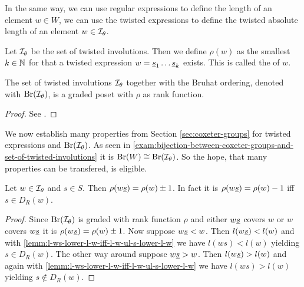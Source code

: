 In the same way, we can use regular expressions to define the length of an element $w \in W$, we can use the twisted expressions to define the twisted absolute length of an element $w \in \mathcal{I}_{\theta}$.

\begin{defi}
	Let $\mathcal{I}_{\theta}$ be the set of twisted involutions. Then we define $\rho(w)$ as the smallest $k \in \mathbb{N}$ for that a twisted expression $w = \underline{s}_1 \ldots \underline{s}_k$ exists. This is called the  of $w$.
\end{defi}

\begin{lemm}
	The set of twisted involutions $\mathcal{I}_{\theta}$ together with the Bruhat ordering, denoted with $\operatorname{Br}(\mathcal{I}_{\theta})$, is a graded poset with $\rho$ as rank function.

	\begin{proof}
		See \cite[Theorem 4.8]{hultman:bruhat-order}.
	\end{proof}
\end{lemm}

We now establish many properties from Section \ref{sec:coxeter-groups} for twisted expressions and $\operatorname{Br}(\mathcal{I}_{\theta})$. As seen in \ref{exam:bijection-between-coxeter-groups-and-set-of-twisted-involutions} it is $\operatorname{Br}(W) \cong \operatorname{Br}(\mathcal{I}_{\theta})$. So the hope, that many properties can be transfered, is eligible.

\begin{lemm}
	Let $w \in \mathcal{I}_{\theta}$ and $s \in S$. Then $\rho(w \underline{s}) = \rho(w) \pm 1$. In fact it is $\rho(w \underline{s}) = \rho(w) - 1$ iff $s \in D_R(w)$.

	\begin{proof}
		Since $\operatorname{Br}(\mathcal{I}_{\theta})$ is graded with rank function $\rho$ and either $w \underline{s}$ covers $w$ or $w$ covers $w \underline{s}$ it is $\rho(w \underline{s}) = \rho(w) \pm 1$. Now suppose $w \underline{s} < w$. Then $l(w \underline{s}) < l(w)$ and with \ref{lemm:l-ws-lower-l-w-iff-l-w-ul-s-lower-l-w} we have $l(w s) < l(w)$ yielding $s \in D_R(w)$. The other way around suppose $w \underline{s} > w$. Then $l(w \underline{s}) > l(w)$ and again with \ref{lemm:l-ws-lower-l-w-iff-l-w-ul-s-lower-l-w} we have $l(w s) > l(w)$ yielding $s \notin D_R(w)$.
	\end{proof}
\end{lemm}

